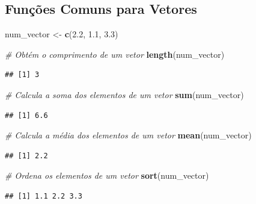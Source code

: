 \documentclass[
]{book}
\newenvironment{Shaded}{\begin{snugshade}}{\end{snugshade}}
\newcommand{\CommentTok}[1]{\textcolor[rgb]{0.56,0.35,0.01}{\textit{#1}}}
\newcommand{\FloatTok}[1]{\textcolor[rgb]{0.00,0.00,0.81}{#1}}
\newcommand{\FunctionTok}[1]{\textcolor[rgb]{0.13,0.29,0.53}{\textbf{#1}}}
\newcommand{\NormalTok}[1]{#1}
\newcommand{\OtherTok}[1]{\textcolor[rgb]{0.56,0.35,0.01}{#1}}
\begin{document}
\subsection{Funções Comuns para Vetores}\label{funuxe7uxf5es-comuns-para-vetores}

\begin{Shaded}
\begin{Highlighting}[]
\NormalTok{num\_vector }\OtherTok{\textless{}{-}} \FunctionTok{c}\NormalTok{(}\FloatTok{2.2}\NormalTok{, }\FloatTok{1.1}\NormalTok{, }\FloatTok{3.3}\NormalTok{)}

\CommentTok{\# Obtém o comprimento de um vetor}
\FunctionTok{length}\NormalTok{(num\_vector)}
\end{Highlighting}
\end{Shaded}

\begin{verbatim}
## [1] 3
\end{verbatim}

\begin{Shaded}
\begin{Highlighting}[]
\CommentTok{\# Calcula a soma dos elementos de um vetor}
\FunctionTok{sum}\NormalTok{(num\_vector)}
\end{Highlighting}
\end{Shaded}

\begin{verbatim}
## [1] 6.6
\end{verbatim}

\begin{Shaded}
\begin{Highlighting}[]
\CommentTok{\# Calcula a média dos elementos de um vetor}
\FunctionTok{mean}\NormalTok{(num\_vector)}
\end{Highlighting}
\end{Shaded}

\begin{verbatim}
## [1] 2.2
\end{verbatim}

\begin{Shaded}
\begin{Highlighting}[]
\CommentTok{\# Ordena os elementos de um vetor}
\FunctionTok{sort}\NormalTok{(num\_vector)}
\end{Highlighting}
\end{Shaded}

\begin{verbatim}
## [1] 1.1 2.2 3.3
\end{verbatim}
\end{document}
